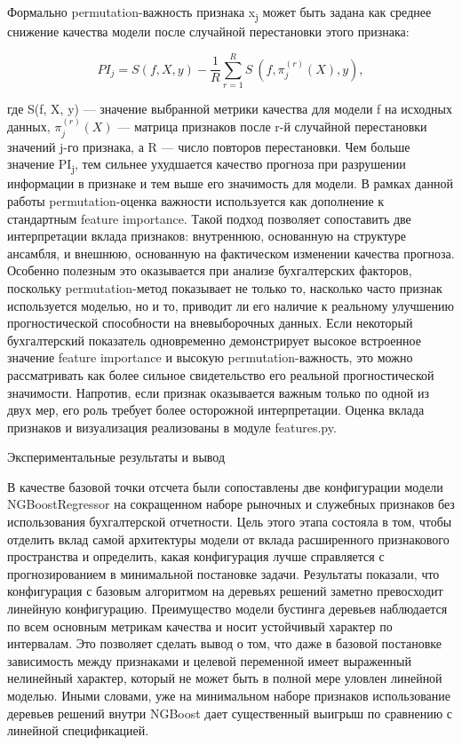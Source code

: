 \documentclass[
]{article}
\begin{document}
Формально permutation-важность признака x\textsubscript{j} может быть задана как среднее снижение качества модели после случайной перестановки этого признака:

\[PI_{j} = S(f,X,y) - \frac{1}{R}\sum_{r = 1}^{R}{S\text{ ⁣}}\left( f,\pi_{j}^{(r)}(X),y \right),\]

где S(f, X, y) --- значение выбранной метрики качества для модели f на исходных данных, \(\pi_{j}^{(r)}(X)\) --- матрица признаков после r-й случайной перестановки значений j-го признака, а R --- число повторов перестановки. Чем больше значение PI\textsubscript{j}, тем сильнее ухудшается качество прогноза при разрушении информации в признаке и тем выше его значимость для модели. В рамках данной работы permutation-оценка важности используется как дополнение к стандартным feature importance. Такой подход позволяет сопоставить две интерпретации вклада признаков: внутреннюю, основанную на структуре ансамбля, и внешнюю, основанную на фактическом изменении качества прогноза. Особенно полезным это оказывается при анализе бухгалтерских факторов, поскольку permutation-метод показывает не только то, насколько часто признак используется моделью, но и то, приводит ли его наличие к реальному улучшению прогностической способности на вневыборочных данных. Если некоторый бухгалтерский показатель одновременно демонстрирует высокое встроенное значение feature importance и высокую permutation-важность, это можно рассматривать как более сильное свидетельство его реальной прогностической значимости. Напротив, если признак оказывается важным только по одной из двух мер, его роль требует более осторожной интерпретации. Оценка вклада признаков и визуализация реализованы в модуле features.py.

Экспериментальные результаты и вывод

В качестве базовой точки отсчета были сопоставлены две конфигурации модели NGBoostRegressor на сокращенном наборе рыночных и служебных признаков без использования бухгалтерской отчетности. Цель этого этапа состояла в том, чтобы отделить вклад самой архитектуры модели от вклада расширенного признакового пространства и определить, какая конфигурация лучше справляется с прогнозированием в минимальной постановке задачи. Результаты показали, что конфигурация с базовым алгоритмом на деревьях решений заметно превосходит линейную конфигурацию. Преимущество модели бустинга деревьев наблюдается по всем основным метрикам качества и носит устойчивый характер по интервалам. Это позволяет сделать вывод о том, что даже в базовой постановке зависимость между признаками и целевой переменной имеет выраженный нелинейный характер, который не может быть в полной мере уловлен линейной моделью. Иными словами, уже на минимальном наборе признаков использование деревьев решений внутри NGBoost дает существенный выигрыш по сравнению с линейной спецификацией.
\end{document}
